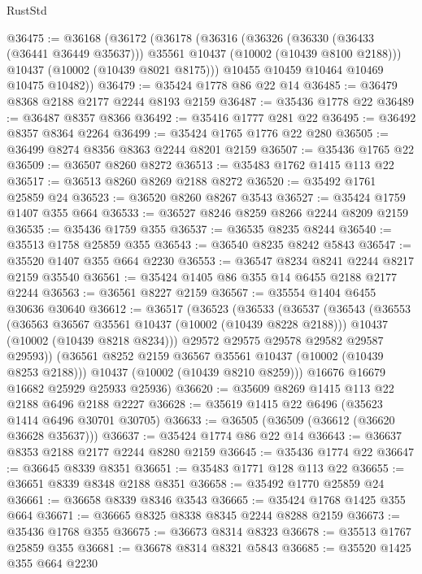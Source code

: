\begin{lexlean}{RustStd}
\begin{coremodule}
@36475 := @36168
    (@36172
      (@36178
        (@36316
          (@36326
            (@36330 (@36433 (@36441 @36449 @35637)))
            @35561
            @10437
            (@10002 (@10439 @8100 @2188)))
          @10437
          (@10002 (@10439 @8021 @8175)))
        @10455
        @10459
        @10464
        @10469
        @10475
        @10482))
@36479 := @35424 @1778 @86 @22 @14
@36485 := @36479 @8368 @2188 @2177 @2244 @8193 @2159
@36487 := @35436 @1778 @22
@36489 := @36487 @8357 @8366
@36492 := @35416 @1777 @281 @22
@36495 := @36492 @8357 @8364 @2264
@36499 := @35424 @1765 @1776 @22 @280
@36505 := @36499 @8274 @8356 @8363 @2244 @8201 @2159
@36507 := @35436 @1765 @22
@36509 := @36507 @8260 @8272
@36513 := @35483 @1762 @1415 @113 @22
@36517 := @36513 @8260 @8269 @2188 @8272
@36520 := @35492 @1761 @25859 @24
@36523 := @36520 @8260 @8267 @3543
@36527 := @35424 @1759 @1407 @355 @664
@36533 := @36527 @8246 @8259 @8266 @2244 @8209 @2159
@36535 := @35436 @1759 @355
@36537 := @36535 @8235 @8244
@36540 := @35513 @1758 @25859 @355
@36543 := @36540 @8235 @8242 @5843
@36547 := @35520 @1407 @355 @664 @2230
@36553 := @36547 @8234 @8241 @2244 @8217 @2159 @35540
@36561 := @35424 @1405 @86 @355 @14 @6455 @2188 @2177 @2244
@36563 := @36561 @8227 @2159
@36567 := @35554 @1404 @6455 @30636 @30640
@36612 := @36517
    (@36523
      (@36533
        (@36537
          (@36543
            (@36553
              (@36563 @36567 @35561 @10437 (@10002 (@10439 @8228 @2188)))
              @10437
              (@10002 (@10439 @8218 @8234)))
            @29572
            @29575
            @29578
            @29582
            @29587
            @29593))
        (@36561 @8252 @2159 @36567 @35561 @10437 (@10002 (@10439 @8253 @2188)))
        @10437
        (@10002 (@10439 @8210 @8259)))
      @16676
      @16679
      @16682
      @25929
      @25933
      @25936)
@36620 := @35609 @8269 @1415 @113 @22 @2188 @6496 @2188 @2227
@36628 := @35619 @1415 @22 @6496 (@35623 @1414 @6496 @30701 @30705)
@36633 := @36505 (@36509 (@36612 (@36620 @36628 @35637)))
@36637 := @35424 @1774 @86 @22 @14
@36643 := @36637 @8353 @2188 @2177 @2244 @8280 @2159
@36645 := @35436 @1774 @22
@36647 := @36645 @8339 @8351
@36651 := @35483 @1771 @128 @113 @22
@36655 := @36651 @8339 @8348 @2188 @8351
@36658 := @35492 @1770 @25859 @24
@36661 := @36658 @8339 @8346 @3543
@36665 := @35424 @1768 @1425 @355 @664
@36671 := @36665 @8325 @8338 @8345 @2244 @8288 @2159
@36673 := @35436 @1768 @355
@36675 := @36673 @8314 @8323
@36678 := @35513 @1767 @25859 @355
@36681 := @36678 @8314 @8321 @5843
@36685 := @35520 @1425 @355 @664 @2230

\end{coremodule}
\end{lexlean}
